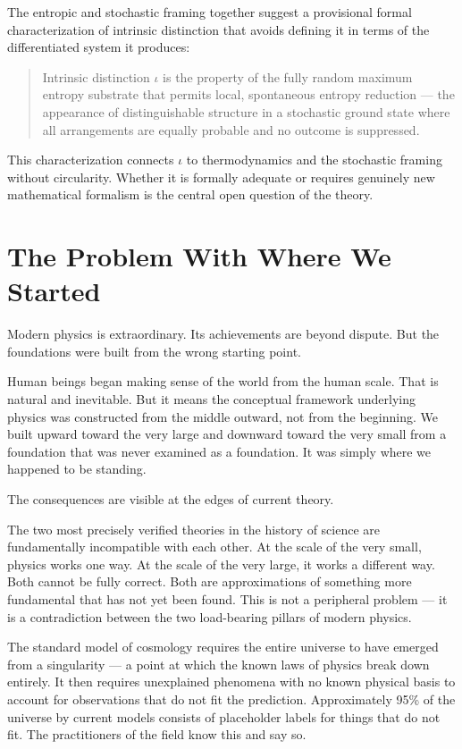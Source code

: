 \documentclass[11pt]{article}
\begin{document}
The entropic and stochastic framing together suggest a provisional formal
characterization of intrinsic distinction that avoids defining it in terms of
the differentiated system it produces:

\begin{quote}
Intrinsic distinction \(\iota\) is the property of the fully random maximum
entropy substrate that permits local, spontaneous entropy reduction — the
appearance of distinguishable structure in a stochastic ground state where
all arrangements are equally probable and no outcome is suppressed.
\end{quote}

This characterization connects \(\iota\) to thermodynamics and the stochastic
framing without circularity. Whether it is formally adequate or requires
genuinely new mathematical formalism is the central open question of the theory.
\section{The Problem With Where We Started}
\label{sec:org6f8a951}

Modern physics is extraordinary. Its achievements are beyond dispute. But the
foundations were built from the wrong starting point.

Human beings began making sense of the world from the human scale. That is
natural and inevitable. But it means the conceptual framework underlying physics
was constructed from the middle outward, not from the beginning. We built upward
toward the very large and downward toward the very small from a foundation that
was never examined as a foundation. It was simply where we happened to be
standing.

The consequences are visible at the edges of current theory.

The two most precisely verified theories in the history of science are
fundamentally incompatible with each other. At the scale of the very small,
physics works one way. At the scale of the very large, it works a different way.
Both cannot be fully correct. Both are approximations of something more
fundamental that has not yet been found. This is not a peripheral problem — it
is a contradiction between the two load-bearing pillars of modern physics.

The standard model of cosmology requires the entire universe to have emerged from
a singularity — a point at which the known laws of physics break down entirely.
It then requires unexplained phenomena with no known physical basis to account
for observations that do not fit the prediction. Approximately 95\% of the
universe by current models consists of placeholder labels for things that do not
fit. The practitioners of the field know this and say so.
\end{document}
